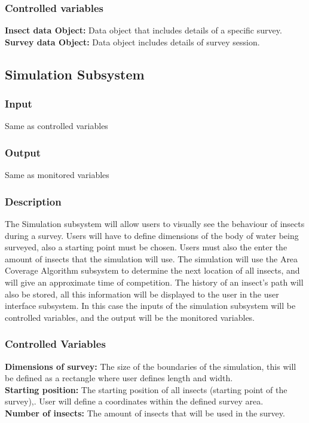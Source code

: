 \documentclass[11pt]{article}
\begin{document}
\subsubsection{Controlled variables}
\textbf{Insect data Object:} Data object that includes details of a specific survey. \\
\textbf{Survey data Object:} Data object includes details of survey session.

\subsection{Simulation Subsystem}
\subsubsection{Input} Same as controlled variables
\subsubsection{Output} Same as monitored variables
\subsubsection{Description}
The Simulation subsystem will allow users to visually see the behaviour of insects during a survey. Users will have to define dimensions of the body of water being surveyed, also a starting point must be chosen. Users must also the enter the amount of insects that the simulation will use. The simulation will use the Area Coverage Algorithm subsystem to determine the next location of all insects, and will give an approximate time of competition. The history of an insect's path will also be stored, all this information will be displayed to the user in the user interface subsystem. In this case the inputs of the simulation subsystem will be controlled variables, and the output will be the monitored variables.
\subsubsection{Controlled Variables}
\textbf{Dimensions of survey:} The size of the boundaries of the simulation, this will be defined as a rectangle where user defines length and width. \\
\textbf{Starting position:} The starting position of all insects (starting point of the survey),. User will define a coordinates within the defined survey area. \\
\textbf{Number of insects:} The amount of insects that will be used in the survey.
\end{document}

